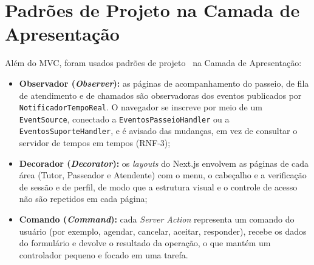 \FloatBarrier
\section{Padrões de Projeto na Camada de Apresentação}
\label{sec-ihc-padroes}

Além do MVC, foram usados padrões de projeto~\cite{falbo:notas18} na Camada de Apresentação:

\begin{itemize}
	\item \textbf{Observador (\textit{Observer}):} as páginas de acompanhamento do passeio, de fila de atendimento e de chamados são observadoras dos eventos publicados por \texttt{NotificadorTempoReal}. O navegador se inscreve por meio de um \texttt{EventSource}, conectado a \texttt{EventosPasseioHandler} ou a \texttt{EventosSuporteHandler}, e é avisado das mudanças, em vez de consultar o servidor de tempos em tempos (RNF-3);
	\item \textbf{Decorador (\textit{Decorator}):} os \textit{layouts} do Next.js envolvem as páginas de cada área (Tutor, Passeador e Atendente) com o menu, o cabeçalho e a verificação de sessão e de perfil, de modo que a estrutura visual e o controle de acesso não são repetidos em cada página;
	\item \textbf{Comando (\textit{Command}):} cada \textit{Server Action} representa um comando do usuário (por exemplo, agendar, cancelar, aceitar, responder), recebe os dados do formulário e devolve o resultado da operação, o que mantém um controlador pequeno e focado em uma tarefa.
\end{itemize}
